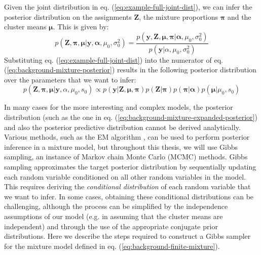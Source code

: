 Given the joint distribution in eq. (\ref{eq:example-full-joint-dist}), we can infer the posterior distribution on the assignments $\boldsymbol{Z}$, the mixture proportions $\boldsymbol{\pi}$ and the cluster means $\boldsymbol{\mu}$. This is given by:
\begin{equation}
p(\boldsymbol{Z},\boldsymbol{\pi},\boldsymbol{\mu} \vert \boldsymbol{y}, \boldsymbol{\alpha},\mu_0,\sigma_0^2) = \frac{p(\boldsymbol{y}, \boldsymbol{Z}, \boldsymbol{\mu},\boldsymbol{\pi} \vert \boldsymbol{\alpha},\mu_0,\sigma_0^2)}{p(\boldsymbol{y} \vert \alpha,\mu_0,\sigma_0^2)}
\label{eq:background-mixture-posterior}
\end{equation}
Substituting eq. (\ref{eq:example-full-joint-dist}) into the numerator of eq. (\ref{eq:background-mixture-posterior}) results in the following posterior distribution over the parameters that we want to infer:
\begin{equation}
p(\boldsymbol{Z},\boldsymbol{\pi},\boldsymbol{\mu} \vert \boldsymbol{y},\alpha,\mu_0,s_0) \propto p(\boldsymbol{y} \vert \boldsymbol{Z}, \boldsymbol{\mu},\boldsymbol{\pi}) p(\boldsymbol{Z} \vert \boldsymbol{\pi}) p(\boldsymbol{\pi} \vert \boldsymbol{\alpha}) p(\boldsymbol{\mu} \vert \mu_0, s_0)
\label{eq:background-mixture-expanded-posterior}
\end{equation}

In many cases for the more interesting and complex models, the posterior distribution (such as the one in eq. (\ref{eq:background-mixture-expanded-posterior}) and also the posterior predictive distribution cannot be derived analytically. Various methods, such as the EM algorithm \cite{gelman2014bayesian}, can be used to perform posterior inference in a mixture model, but throughout this thesis, we will use Gibbs sampling, an instance of Markov chain Monte Carlo (MCMC) methods. Gibbs sampling approximates the target posterior distribution by sequentially updating each random variable conditioned on all other random variables in the model. This requires deriving the \emph{conditional distribution} of each random variable that we want to infer. In some cases, obtaining these conditional distributions can be challenging, although the process can be simplified by the independence assumptions of our model (e.g. in assuming that the cluster means are independent) and through the use of the appropriate conjugate prior distributions.  Here we describe the steps required to construct a Gibbs sampler for the mixture model defined in eq. (\ref{eq:background-finite-mixture}).

